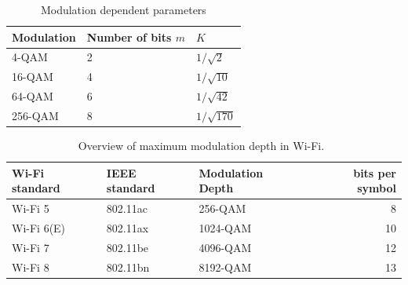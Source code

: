 %
\begin{table}[htb]
\centering
\scriptsize
\renewcommand\arraystretch{1.6}
\caption{Modulation dependent parameters}\label{tab:param}
\begin{tabular}{ p{3cm} p{3cm} p{3cm}}\toprule
Modulation&Number of bits $m$&$K$\\\midrule
4-QAM&2&$1/\sqrt{2}$\\
16-QAM&4&$1/\sqrt{10}$\\
64-QAM&6&$1/\sqrt{42}$\\
256-QAM&8&$1/\sqrt{170}$\\\bottomrule
\end{tabular}
\end{table}
%


\begin{table}[hbtp]
    \centering
    \scriptsize
    \caption{Overview of maximum modulation depth in Wi-Fi.~\cite{enwiki:1210657347}}
    \label{tab:wifi-qam}
\renewcommand\arraystretch{1.6}
    \begin{tabular}{l l l r}
    \toprule
    Wi-Fi standard & IEEE standard & Modulation Depth & bits per symbol\\
    \midrule
    Wi-Fi 5 & 802.11ac   &  256-QAM& 8\\
    Wi-Fi 6(E) & 802.11ax   &  1024-QAM & 10\\
    Wi-Fi 7 & 802.11be   &  4096-QAM &12\\
    Wi-Fi 8 & 802.11bn   &  8192-QAM &13\\
    \bottomrule
    \end{tabular}
    
\end{table}

